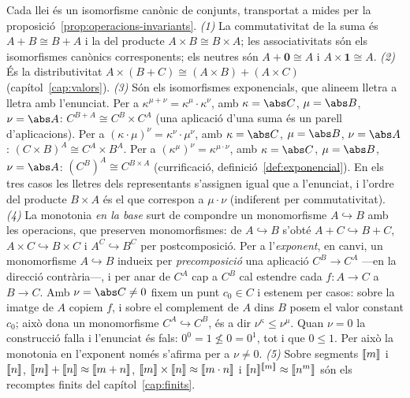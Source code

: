 \begin{prova}
Cada llei és un isomorfisme canònic de conjunts, transportat a mides per la
proposició~\ref{prop:operacions-invariants}. \emph{(1)} La commutativitat de
la suma és \(A+B\cong B+A\) i la del producte \(A\times B\cong B\times A\); les
associativitats són els isomorfismes canònics corresponents; els neutres són
\(A+\mathbf0\cong A\) i \(A\times\mathbf1\cong A\). \emph{(2)} És la
distributivitat \(A\times(B+C)\cong(A\times B)+(A\times C)\)
(capítol~\ref{cap:valors}). \emph{(3)} Són els isomorfismes exponencials, que alineem lletra a lletra amb
l'enunciat. Per a \(\kappa^{\mu+\nu}=\kappa^{\mu}\cdot\kappa^{\nu}\), amb
\(\kappa=\abs C\), \(\mu=\abs B\), \(\nu=\abs A\): \(C^{B+A}\cong C^{B}\times
C^{A}\) (una aplicació d'una suma és un parell d'aplicacions). Per a
\((\kappa\cdot\mu)^{\nu}=\kappa^{\nu}\cdot\mu^{\nu}\), amb \(\kappa=\abs C\),
\(\mu=\abs B\), \(\nu=\abs A\): \((C\times B)^{A}\cong C^{A}\times B^{A}\). Per
a \((\kappa^{\mu})^{\nu}=\kappa^{\mu\cdot\nu}\), amb \(\kappa=\abs C\),
\(\mu=\abs B\), \(\nu=\abs A\): \((C^{B})^{A}\cong C^{B\times A}\)
(currificació, definició~\ref{def:exponencial}). En els tres casos les lletres
dels representants s'assignen igual que a l'enunciat, i l'ordre del producte
\(B\times A\) és el que correspon a \(\mu\cdot\nu\) (indiferent per
commutativitat).
\emph{(4)} La monotonia \emph{en la base} surt de compondre un monomorfisme
\(A\hookrightarrow B\) amb les operacions, que preserven monomorfismes: de
\(A\hookrightarrow B\) s'obté \(A+C\hookrightarrow B+C\),
\(A\times C\hookrightarrow B\times C\) i \(A^{C}\hookrightarrow B^{C}\) per
postcomposició. Per a l'\emph{exponent}, en canvi, un monomorfisme
\(A\hookrightarrow B\) indueix per \emph{precomposició} una aplicació
\(C^{B}\to C^{A}\) ---en la direcció contrària---, i per anar de \(C^{A}\) cap
a \(C^{B}\) cal estendre cada \(f\colon A\to C\) a \(B\to C\). Amb
\(\nu=\abs C\neq 0\) fixem un punt \(c_0\in C\) i estenem per casos: sobre la
imatge de \(A\) copiem \(f\), i sobre el complement de \(A\) dins \(B\)
posem el valor constant \(c_0\); això dona un monomorfisme \(C^{A}\hookrightarrow
C^{B}\), és a dir \(\nu^{\kappa}\le\nu^{\mu}\). Quan \(\nu=0\) la construcció
falla i l'enunciat és fals: \(0^{0}=1\not\le 0=0^{1}\), tot i que \(0\le 1\).
Per això la monotonia en l'exponent només s'afirma per a \(\nu\neq 0\).
\emph{(5)} Sobre segments
\(\llbracket m\rrbracket\) i \(\llbracket n\rrbracket\), \(\llbracket m\rrbracket+\llbracket n\rrbracket\approx\llbracket m+n\rrbracket\),
\(\llbracket m\rrbracket\times\llbracket n\rrbracket\approx\llbracket m\cdot n\rrbracket\) i
\(\llbracket n\rrbracket^{\llbracket m\rrbracket}\approx\llbracket n^{m}\rrbracket\) són els recomptes finits del
capítol~\ref{cap:finits}.
\end{prova}

